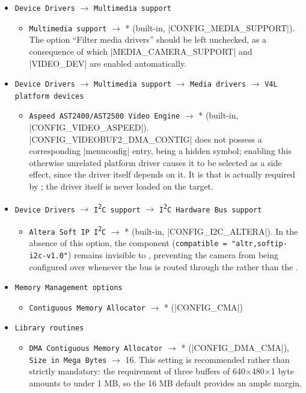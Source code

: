 \begin{itemize}
    \item \texttt{Device Drivers} $\rightarrow$ \texttt{Multimedia support}
    \begin{itemize}
        \item \texttt{Multimedia support} $\rightarrow$ * (built-in, |CONFIG_MEDIA_SUPPORT|). The option ``Filter media drivers'' should be left unchecked, as a consequence of which |MEDIA_CAMERA_SUPPORT| and |VIDEO_DEV| are enabled automatically.
    \end{itemize}
    \item \texttt{Device Drivers} $\rightarrow$ \texttt{Multimedia support} $\rightarrow$ \texttt{Media drivers} $\rightarrow$ \texttt{V4L platform devices}
    \begin{itemize}
        \item \texttt{Aspeed AST2400/AST2500 Video Engine} $\rightarrow$ * (built-in, |CONFIG_VIDEO_ASPEED|). |CONFIG_VIDEOBUF2_DMA_CONTIG| does not possess a corresponding |menuconfig| entry, being a hidden symbol; enabling this otherwise unrelated platform driver causes it to be selected as a side effect, since the driver itself depends on it. It is  that is actually required by ; the  driver itself is never loaded on the target.
    \end{itemize}
    \item \texttt{Device Drivers} $\rightarrow$ \texttt{I\textsuperscript{2}C support} $\rightarrow$ \texttt{I\textsuperscript{2}C Hardware Bus support}
    \begin{itemize}
        \item \texttt{Altera Soft IP I\textsuperscript{2}C} $\rightarrow$ * (built-in, |CONFIG_I2C_ALTERA|). In the absence of this option, the   component (\texttt{compatible = "altr,softip-i2c-v1.0"}) remains invisible to , preventing the camera from being configured over  whenever the bus is routed through the  rather than the .
    \end{itemize}
    \item \texttt{Memory Management options}
    \begin{itemize}
        \item \texttt{Contiguous Memory Allocator} $\rightarrow$ * (|CONFIG_CMA|)
    \end{itemize}
    \item \texttt{Library routines}
    \begin{itemize}
        \item \texttt{DMA Contiguous Memory Allocator} $\rightarrow$ * (|CONFIG_DMA_CMA|), \texttt{Size in Mega Bytes} $\rightarrow$ 16. This setting is recommended rather than strictly mandatory: the requirement of three buffers of 640$\times$480$\times$1 byte amounts to under 1 MB, so the 16 MB default provides an ample margin.
    \end{itemize}
\end{itemize}

